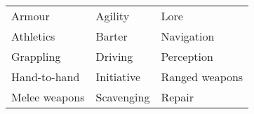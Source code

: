 
\let\b\stat

{\small\begin{tabularx}{\linewidth}{XXX}
  \b{Brawn}     & \b{Wit}    & \b{Brains}     \\
  \hline
  Armour        & Agility    & Lore           \\
  Athletics     & Barter     & Navigation     \\
  Grappling     & Driving    & Perception     \\
  Hand-to-hand  & Initiative & Ranged weapons \\
  Melee weapons & Scavenging & Repair
\end{tabularx}}
